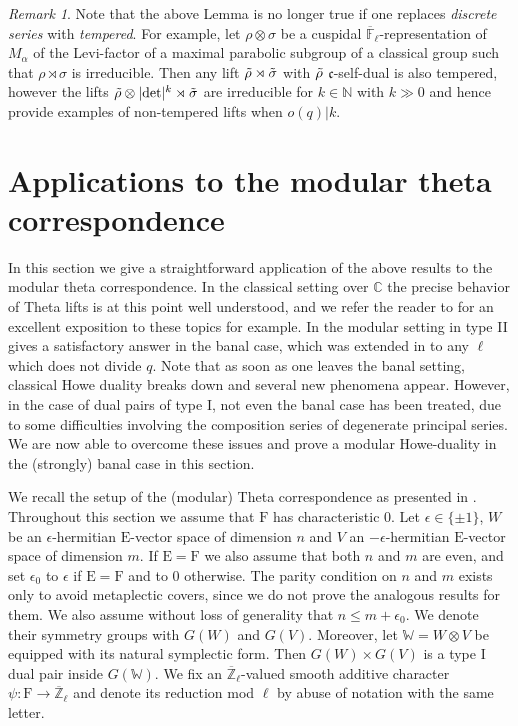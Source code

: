 \documentclass[10pt,a4paper]{article}
\theoremstyle{remark}
\newtheorem{rem}{Remark}[section]
\theoremstyle{definition}
\newcommand{\fl}{{\overline{\mathbb{F}}_\ell}}
\newcommand{\zl}{{\overline{\mathbb{Z}}_\ell}}
\newcommand{\ra}{\rightarrow}
\newcommand{\NN}{\mathbb{N}}
\newcommand{\trho}{{\Tilde{\rho}}}
\newcommand{\tsigma}{\Tilde{\sigma}}
\newcommand{\FF}{\mathrm{F}}
\newcommand{\CC}{\mathbb{C}}
\newcommand{\WW}{\mathbb{W}}
\newcommand{\EE}{\mathrm{E}}
\newcommand{\fc}{\mathfrak{c}}
\begin{document}
\begin{rem}
    Note that the above Lemma is no longer true if one replaces \emph{discrete series} with \emph{tempered}.
    For example, let $\rho\otimes\sigma$ be a cuspidal $\fl$-representation of $M_\alpha$ of the Levi-factor of a maximal parabolic subgroup of a classical group such that $\rho\rtimes \sigma$ is irreducible. Then any lift $\trho\rtimes\tsigma$ with $\trho$ $\fc$-self-dual is also tempered, however the lifts $\trho\otimes\lvert\det\rvert^k\rtimes\tsigma$ are irreducible for $k\in\NN$ with $k\gg0$ and hence provide examples of non-tempered lifts when $o(q)\lvert k$.
\end{rem}
\section{Applications to the modular theta correspondence}\label{S:Howe}
In this section we give a straightforward application of the above results to the modular theta correspondence. In the classical setting over $\CC$ the precise behavior of Theta lifts is at this point well understood, and we refer the reader to \cite{GanAWS2022} for an excellent exposition to these topics for example. In the modular setting in type II \cite{Min08} gives a satisfactory answer in the banal case, which was extended in \cite{Droschl2026} to any $\ell$ which does not divide $q$. Note that as soon as one leaves the banal setting, classical Howe duality breaks down and several new phenomena appear. However, in the case of dual pairs of type I, not even the banal case has been treated, due to some difficulties involving the composition series of degenerate principal series. We are now able to overcome these issues and prove a modular Howe-duality in the (strongly) banal case in this section.

We recall the setup of the (modular) Theta correspondence as presented in \cite{Trias2025}. Throughout this section we assume that $\FF$ has characteristic $0$.
Let $\epsilon\in\{\pm1\}$, $W$ be an $\epsilon$-hermitian $\EE$-vector space of dimension $n$ and $V$ an $-\epsilon$-hermitian $\EE$-vector space of dimension $m$. If $\EE=\FF$ we also assume that both $n$ and $m$ are even, and set $\epsilon_0$ to $\epsilon$ if $\EE=\FF$ and to $0$ otherwise. The parity condition on $n$ and $m$ exists only to avoid metaplectic covers, since we do not prove the analogous results for them.
 We also assume without loss of generality that $n\le m+\epsilon_0$.
We denote their symmetry groups with $G(W)$ and $G(V)$. Moreover, let $\WW=W\otimes V$ be equipped with its natural symplectic form. Then $G(W)\times G(V)$ is a type I dual pair inside $G(\WW)$. We fix an $\zl$-valued smooth additive character $\psi\colon \FF\ra \zl$ and denote its reduction mod $\ell$ by abuse of notation with the same letter. 
\end{document}
